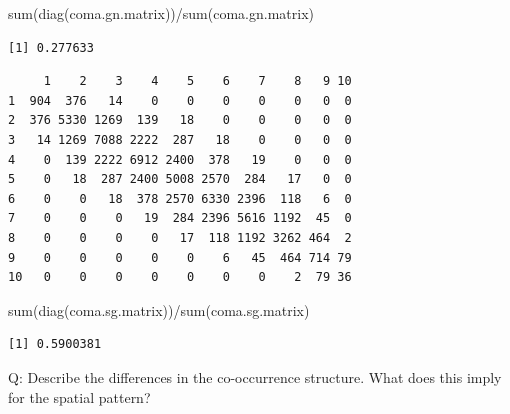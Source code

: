 \documentclass[
  letterpaper,
  DIV=11,
  numbers=noendperiod]{scrartcl}
\newenvironment{Shaded}{\begin{snugshade}}{\end{snugshade}}
\newcommand{\AttributeTok}[1]{\textcolor[rgb]{0.40,0.45,0.13}{#1}}
\newcommand{\DecValTok}[1]{\textcolor[rgb]{0.68,0.00,0.00}{#1}}
\newcommand{\FunctionTok}[1]{\textcolor[rgb]{0.28,0.35,0.67}{#1}}
\newcommand{\NormalTok}[1]{\textcolor[rgb]{0.00,0.23,0.31}{#1}}
\newcommand{\OtherTok}[1]{\textcolor[rgb]{0.00,0.23,0.31}{#1}}
\newcommand{\SpecialCharTok}[1]{\textcolor[rgb]{0.37,0.37,0.37}{#1}}
\newcommand{\StringTok}[1]{\textcolor[rgb]{0.13,0.47,0.30}{#1}}
\begin{document}
\begin{Shaded}
\begin{Highlighting}[]
\FunctionTok{sum}\NormalTok{(}\FunctionTok{diag}\NormalTok{(coma.gn.matrix))}\SpecialCharTok{/}\FunctionTok{sum}\NormalTok{(coma.gn.matrix)}
\end{Highlighting}
\end{Shaded}

\begin{verbatim}
[1] 0.277633
\end{verbatim}

\begin{Shaded}
\end{Shaded}

\begin{verbatim}
     1    2    3    4    5    6    7    8   9 10
1  904  376   14    0    0    0    0    0   0  0
2  376 5330 1269  139   18    0    0    0   0  0
3   14 1269 7088 2222  287   18    0    0   0  0
4    0  139 2222 6912 2400  378   19    0   0  0
5    0   18  287 2400 5008 2570  284   17   0  0
6    0    0   18  378 2570 6330 2396  118   6  0
7    0    0    0   19  284 2396 5616 1192  45  0
8    0    0    0    0   17  118 1192 3262 464  2
9    0    0    0    0    0    6   45  464 714 79
10   0    0    0    0    0    0    0    2  79 36
\end{verbatim}

\begin{Shaded}
\begin{Highlighting}[]
\FunctionTok{sum}\NormalTok{(}\FunctionTok{diag}\NormalTok{(coma.sg.matrix))}\SpecialCharTok{/}\FunctionTok{sum}\NormalTok{(coma.sg.matrix)}
\end{Highlighting}
\end{Shaded}

\begin{verbatim}
[1] 0.5900381
\end{verbatim}

Q: Describe the differences in the co-occurrence structure. What does
this imply for the spatial pattern?
\end{document}
